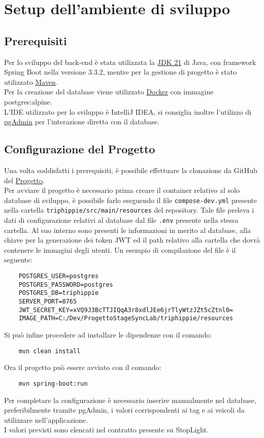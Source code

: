 \section{Setup dell'ambiente di sviluppo}
\subsection{Prerequisiti}
Per lo sviluppo del back-end è stata utilizzata la \href{https://www.oracle.com/it/java/technologies/downloads/}{JDK 21} di Java, con framework Spring Boot nella versione 3.3.2, mentre per la gestione di progetto è stato utilizzato \href{https://maven.apache.org/}{Maven}.\\
Per la creazione del database viene utilizzato \href{https://www.docker.com/}{Docker} con immagine postgres:alpine. \\
L'IDE utilizzato per lo sviluppo è IntelliJ IDEA, si consiglia inoltre l'utilizzo di \href{https://www.pgadmin.org/}{pgAdmin} per l'interazione diretta con il database.

\subsection{Configurazione del Progetto}
Una volta soddisfatti i prerequisiti, è possibile effettuare la clonazione da GitHub del \href{https://github.com/AlessandroTigani/ProgettoStageSyncLab}{Progetto}.\\
Per avviare il progetto è necessario prima creare il container relativo al solo database di sviluppo, è possibile farlo eseguendo il file \texttt{compose-dev.yml} presente nella cartella \texttt{triphippie/src/main/resources} del repository.
Tale file preleva i dati di configurazione relativi al database dal file \texttt{.env} presente nella stessa cartella.
Al suo interno sono presenti le informazioni in merito al database, alla chiave per la generazione dei token JWT ed il path relativo alla cartella che dovrà contenere le immagini degli utenti. 
Un esempio di compilazione del file è il seguente:
\begin{lstlisting}
    POSTGRES_USER=postgres
    POSTGRES_PASSWORD=postgres
    POSTGRES_DB=triphippie
    SERVER_PORT=8765
    JWT_SECRET_KEY=xVQ9J3BcTTJIQqA3r8xdlJEe6jrTlyWtzJZt5cZtnl0=
    IMAGE_PATH=C:/Dev/ProgettoStageSyncLab/triphippie/resources
\end{lstlisting}
Si può infine procedere ad installare le dipendenze con il comando:
\begin{lstlisting}
    mvn clean install
\end{lstlisting}

\noindent
Ora il progetto può essere avviato con il comando:
\begin{lstlisting}
    mvn spring-boot:run
\end{lstlisting}

\noindent
Per completare la configurazione è necessario inserire manualmente nel database, preferibilmente tramite pgAdmin, i valori corrispondenti ai tag e ai veicoli da utilizzare nell'applicazione.\\
I valori previsti sono elencati nel contratto presente su StopLight.